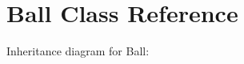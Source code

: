 \hypertarget{classBall}{}\section{Ball Class Reference}
\label{classBall}


Inheritance diagram for Ball\+:
